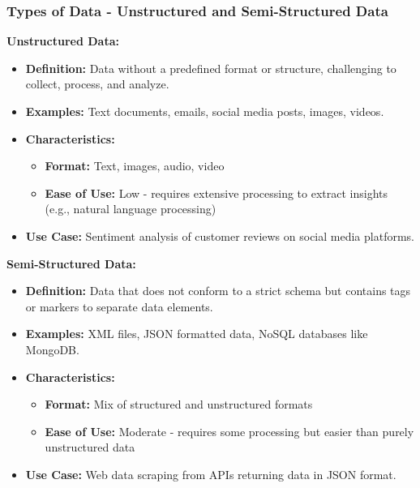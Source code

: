 \documentclass[aspectratio=169]{beamer}
\begin{document}
\begin{frame}[fragile]
    \frametitle{Types of Data - Unstructured and Semi-Structured Data}
    \textbf{Unstructured Data:}
    \begin{itemize}
        \item \textbf{Definition:} Data without a predefined format or structure, challenging to collect, process, and analyze.
        \item \textbf{Examples:} Text documents, emails, social media posts, images, videos.
        \item \textbf{Characteristics:}
        \begin{itemize}
            \item \textbf{Format:} Text, images, audio, video
            \item \textbf{Ease of Use:} Low - requires extensive processing to extract insights (e.g., natural language processing)
        \end{itemize}
        \item \textbf{Use Case:} Sentiment analysis of customer reviews on social media platforms.
    \end{itemize}

    \textbf{Semi-Structured Data:}
    \begin{itemize}
        \item \textbf{Definition:} Data that does not conform to a strict schema but contains tags or markers to separate data elements.
        \item \textbf{Examples:} XML files, JSON formatted data, NoSQL databases like MongoDB.
        \item \textbf{Characteristics:}
        \begin{itemize}
            \item \textbf{Format:} Mix of structured and unstructured formats
            \item \textbf{Ease of Use:} Moderate - requires some processing but easier than purely unstructured data
        \end{itemize}
        \item \textbf{Use Case:} Web data scraping from APIs returning data in JSON format.
    \end{itemize}
\end{frame}
\end{document}
